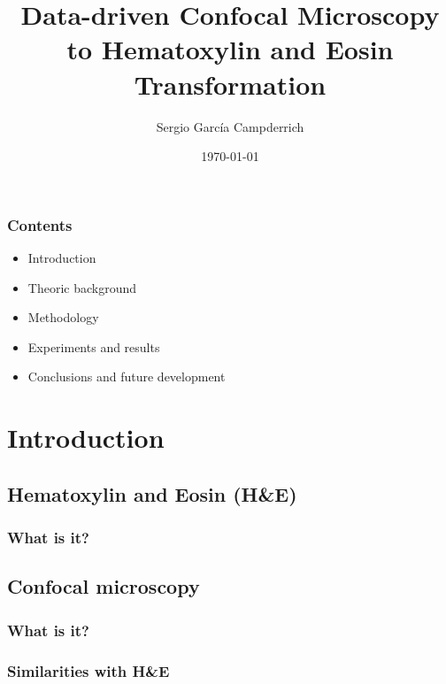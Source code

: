 \documentclass{beamer}
\title{Data-driven Confocal Microscopy to Hematoxylin and Eosin Transformation}
\subtitle{}
\date{\today}
\author{Sergio García Campderrich}
\begin{document}
\maketitle

\begin{frame}
\frametitle{Contents}

\begin{itemize}
\item Introduction\pause
\item Theoric background\pause
\item Methodology\pause
\item Experiments and results\pause
\item Conclusions and future development
\end{itemize}

\end{frame}



\section{Introduction}


\subsection{Hematoxylin and Eosin (H\&E)}

\begin{frame}
\frametitle{What is it?}
\end{frame}

\subsection{Confocal microscopy}

\begin{frame}
\frametitle{What is it?}
\end{frame}

\begin{frame}
\frametitle{Similarities with H\&E}
\end{frame}
\end{document}
